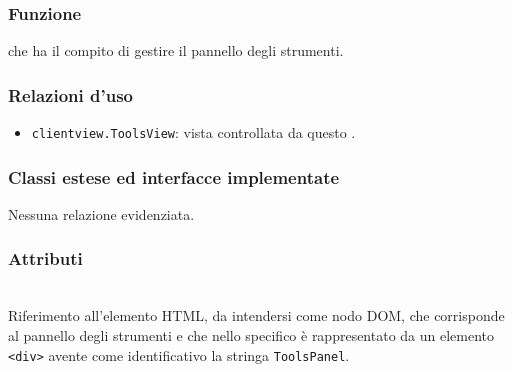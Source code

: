 
\subsubsection*{Funzione}
 che ha il compito di gestire il pannello degli strumenti.

\subsubsection*{Relazioni d'uso}
\begin{itemize}
  \item \texttt{clientview.ToolsView}: vista controllata da questo .
\end{itemize}

\subsubsection*{Classi estese ed interfacce implementate}
Nessuna relazione evidenziata.

\subsubsection*{Attributi}
\begin{description}
\item{}\\
Riferimento all'elemento HTML, da intendersi come nodo DOM, che corrisponde al pannello degli strumenti e che nello specifico è rappresentato da un elemento \verb'<div>' avente come identificativo la stringa \verb'ToolsPanel'.
\end{description}

